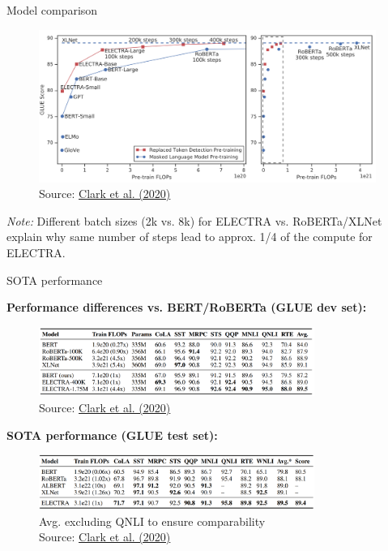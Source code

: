 \begin{frame}{Model comparison}
	
\vfill

	\begin{figure}
		\centering
		\includegraphics[width = 11cm]{figure/electra-glue.png}\\ 
		\footnotesize{Source:} \href{https://arxiv.org/pdf/2003.10555.pdf}{\footnotesize Clark et al. (2020)}
	\end{figure}
	
{\footnotesize \textit{Note:} Different batch sizes (2k vs. 8k) for ELECTRA vs. RoBERTa/XLNet explain why same number of steps lead to approx. 1/4 of the compute for ELECTRA.}

\vfill

\end{frame}


\begin{frame}{SOTA performance}

\vfill

	\textbf{Performance differences vs. BERT/RoBERTa (GLUE dev set):}

	\begin{figure}
		\centering
		\includegraphics[width = 9cm]{figure/electra-sota1.png}\\ 
		{\footnotesize Source: \href{https://arxiv.org/pdf/2003.10555.pdf}{Clark et al. (2020)}}
	\end{figure}

	\textbf{SOTA performance (GLUE test set):}

	\begin{figure}
		\centering
		\includegraphics[width = 9cm]{figure/electra-sota2.png}\\ 
		{\tiny * Avg. excluding QNLI to ensure comparability\\\footnotesize Source: \href{https://arxiv.org/pdf/2003.10555.pdf}{Clark et al. (2020)}}
	\end{figure}
	
\vfill

\end{frame}


\endlecture

